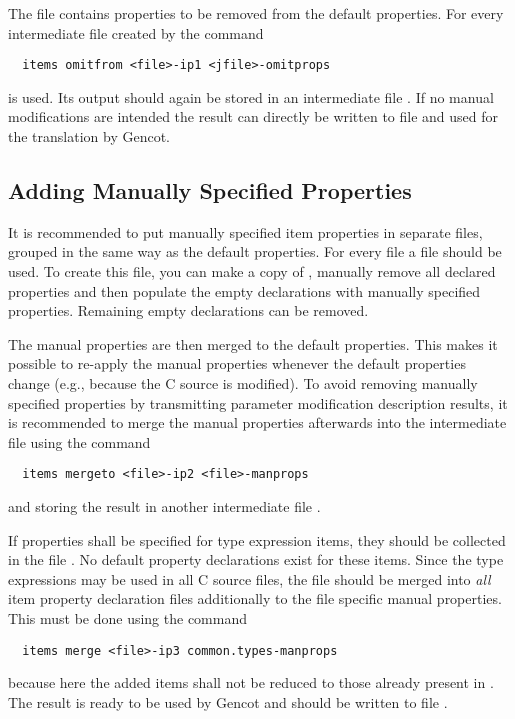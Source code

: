 The file  contains properties to be removed from the default properties. For every intermediate file
 created by  the command 
\begin{verbatim}
  items omitfrom <file>-ip1 <jfile>-omitprops
\end{verbatim}
is used. Its output should again be stored in an intermediate file . If no manual modifications are intended
the result can directly be written to file  and used for the translation by Gencot.

\subsection{Adding Manually Specified Properties}
\label{app-items-manual}

It is recommended to put manually specified item properties in separate files, grouped in the same way as the default 
properties. For every file  a file  should be used. To create this file,
you can make a copy of , manually remove all declared properties and then populate the empty
declarations with manually specified properties. Remaining empty declarations can be removed.

The manual properties are then merged to the default properties. This makes it possible to re-apply the manual properties 
whenever the default properties change (e.g., because the C source is modified). To avoid removing manually specified 
properties by transmitting parameter modification description results, it is recommended to merge the manual properties 
afterwards into the intermediate file  using the command
\begin{verbatim}
  items mergeto <file>-ip2 <file>-manprops
\end{verbatim}
and storing the result in another intermediate file .

If properties shall be specified for type expression items, they should be collected in the file .
No default property declarations exist for these items. Since the type expressions may be used in all C source files, the 
file should be merged into \textit{all} item property declaration files additionally to the file specific manual properties.
This must be done using the command
\begin{verbatim}
  items merge <file>-ip3 common.types-manprops
\end{verbatim}
because here the added items shall not be reduced to those already present in . The result is ready to be used
by Gencot and should be written to file .

